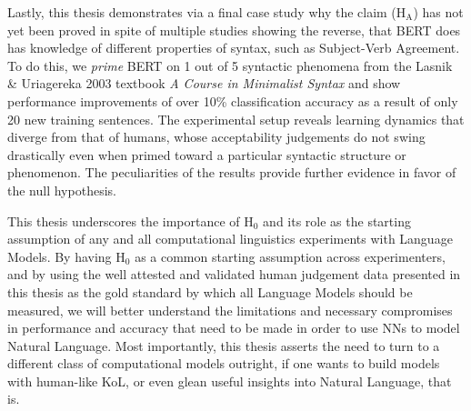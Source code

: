 Lastly, this thesis demonstrates via a final case study why the claim ($\mathrm{H}_\mathrm{A}$) has not yet been proved in spite of multiple studies showing the reverse, that BERT does has knowledge of different properties of syntax, such as Subject-Verb Agreement.  To do this, we \textit{prime} BERT on 1 out of 5 syntactic phenomena from the Lasnik & Uriagereka 2003 textbook \textit{A Course in Minimalist Syntax} and show performance improvements of over 10\% classification accuracy as a result of only 20 new training sentences.  The experimental setup reveals learning dynamics that diverge from that of humans, whose acceptability judgements do not swing drastically even when primed toward a particular syntactic structure or phenomenon.  The peculiarities of the results provide further evidence in favor of the null hypothesis.

This thesis underscores the importance of $\mathrm{H}_0$ and its role as the starting assumption of any and all computational linguistics experiments with Language Models.  By having $\mathrm{H}_0$ as a common starting assumption across experimenters, and by using the well attested and validated human judgement data presented in this thesis as the gold standard by which all Language Models should be measured, we will better understand the limitations and necessary compromises in performance and accuracy that need to be made in order to use NNs to model Natural Language.  Most importantly, this thesis asserts the need to turn to a different class of computational models outright, if one wants to build models with human-like KoL, or even glean useful insights into Natural Language, that is.
